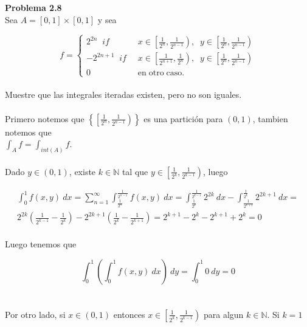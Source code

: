 \documentclass[12pt]{article}
\begin{document}
    \textbf{Problema 2.8} \\

    Sea $A=[0,1]\times [0,1]$ y sea
    
    \begin{equation*}
        f=\left\{
            \begin{aligned}
                2^{2n} \;\;if\;\;    & x\in \left[\frac{1}{2^n},\frac{1}{2^{n-1}}\right),\;\; y\in \left[\frac{1}{2^n},\frac{1}{2^{n-1}}\right) \\
                -2^{2n+1} \;\;if\;\; & x\in \left[\frac{1}{2^{n+1}},\frac{1}{2^{n}}\right),\;\; y\in \left[\frac{1}{2^n},\frac{1}{2^{n-1}}\right) \\
                0   \;\;\;\;\;\;\;\; & \mathrm{en \; otro \; caso.}
            \end{aligned}
        \right.
    \end{equation*}
    \\
    Muestre que las integrales iteradas existen, pero no son iguales.
    \\ \\
    Primero notemos que $\left\{\left[\frac{1}{2^{n}},\frac{1}{2^{n-1}}\right)\right\}$ es una 
    partici\'on para $(0,1)$, tambien notemos que \\ 
    $\int_Af=\int_{int(A)}f$. 
    \\ \\
    Dado $y\in (0,1)$, existe $k\in \mathbb{N}$ tal que 
    $y\in \left[\frac{1}{2^{k}},\frac{1}{2^{k-1}}\right)$, luego 

    \begin{gather*}
        \int_0^1f(x,y)\:dx = 
        \sum_{n=1}^{\infty}\int_{\frac{1}{2^{n}}}^{\frac{1}{2^{n-1}}}f(x,y)\:dx =
        \int_{\frac{1}{2^{k}}}^{\frac{1}{2^{k-1}}}2^{2k}\:dx - \int_{\frac{1}{2^{k+1}}}^{\frac{1}{2^{k}}}2^{2k+1}\:dx =  \\
        2^{2k}\left(\frac{1}{2^{k-1}}-\frac{1}{2^{k}}\right)-2^{2k+1}\left(\frac{1}{2^{k}}-\frac{1}{2^{k+1}}\right) =
        2^{k+1}-2^k-2^{k+1}+2^k = 0
    \end{gather*}
    \\ 
    Luego tenemos que 

    \[\int_0^1\left(\int_0^1 f(x,y)\:dx\right)\:dy =\int_0^1 0\:dy = 0\]
    \\ \\
    Por otro lado, si $x\in (0,1)$ entonces $x\in\left[\frac{1}{2^{k}},\frac{1}{2^{k-1}}\right)$
    para algun $k\in \mathbb{N}$. Si $k=1$
\end{document}

